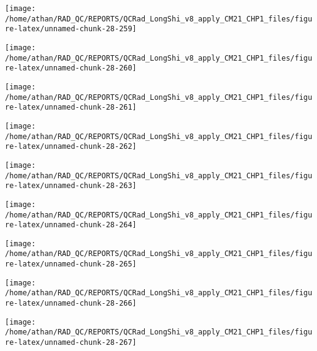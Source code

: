 \documentclass[
  10pt,
  a4paper,oneside]{article}
\begin{document}
\begin{center}\texttt{[image: /home/athan/RAD\_QC/REPORTS/QCRad\_LongShi\_v8\_apply\_CM21\_CHP1\_files/figure-latex/unnamed-chunk-28-259]} \end{center}

\begin{center}\texttt{[image: /home/athan/RAD\_QC/REPORTS/QCRad\_LongShi\_v8\_apply\_CM21\_CHP1\_files/figure-latex/unnamed-chunk-28-260]} \end{center}

\begin{center}\texttt{[image: /home/athan/RAD\_QC/REPORTS/QCRad\_LongShi\_v8\_apply\_CM21\_CHP1\_files/figure-latex/unnamed-chunk-28-261]} \end{center}

\begin{center}\texttt{[image: /home/athan/RAD\_QC/REPORTS/QCRad\_LongShi\_v8\_apply\_CM21\_CHP1\_files/figure-latex/unnamed-chunk-28-262]} \end{center}

\begin{center}\texttt{[image: /home/athan/RAD\_QC/REPORTS/QCRad\_LongShi\_v8\_apply\_CM21\_CHP1\_files/figure-latex/unnamed-chunk-28-263]} \end{center}

\begin{center}\texttt{[image: /home/athan/RAD\_QC/REPORTS/QCRad\_LongShi\_v8\_apply\_CM21\_CHP1\_files/figure-latex/unnamed-chunk-28-264]} \end{center}

\begin{center}\texttt{[image: /home/athan/RAD\_QC/REPORTS/QCRad\_LongShi\_v8\_apply\_CM21\_CHP1\_files/figure-latex/unnamed-chunk-28-265]} \end{center}

\begin{center}\texttt{[image: /home/athan/RAD\_QC/REPORTS/QCRad\_LongShi\_v8\_apply\_CM21\_CHP1\_files/figure-latex/unnamed-chunk-28-266]} \end{center}

\begin{center}\texttt{[image: /home/athan/RAD\_QC/REPORTS/QCRad\_LongShi\_v8\_apply\_CM21\_CHP1\_files/figure-latex/unnamed-chunk-28-267]} \end{center}
\end{document}
